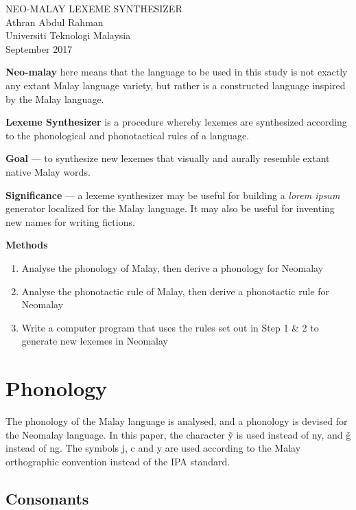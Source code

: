 \documentclass{article}
\newcommand{\grapheme}[1]{\textlangle#1\textrangle}
\begin{document}
\begin{center} {\LARGE NEO-MALAY LEXEME SYNTHESIZER}\\ \bigskip 
Athran Abdul Rahman\\
Universiti Teknologi Malaysia\\
September 2017\end{center}

\textbf{Neo-malay} here means that the language to be used in this study is not exactly any extant Malay language variety, but rather is a constructed language inspired by the Malay language.

\textbf{Lexeme Synthesizer} is a procedure whereby lexemes are synthesized according to the phonological and phonotactical rules of a language.

\textbf{Goal} --- to synthesize new lexemes that visually and aurally resemble extant native Malay words.

\textbf{Significance} --- a lexeme synthesizer may be useful for building a \textit{lorem ipsum} generator localized for the Malay language. It may also be useful for inventing new names for writing fictions.

\textbf{Methods}
\begin{enumerate}
    \item Analyse the phonology of Malay, then derive a phonology for Neomalay
    \item Analyse the phonotactic rule of Malay, then derive a phonotactic rule for Neomalay
    \item Write a computer program that uses the rules set out in Step 1 \& 2 to generate new lexemes in Neomalay
\end{enumerate}

\section{Phonology}

The phonology of the Malay language is analysed, and a phonology is devised for the Neomalay language. In this paper, the character \grapheme{\~y} is used instead of \grapheme{ny}, and \grapheme{\~g} instead of \grapheme{ng}. The symbols \grapheme{j}, \grapheme{c} and \grapheme{y} are used according to the Malay orthographic convention instead of the IPA standard.

\subsection{Consonants}
\end{document}

